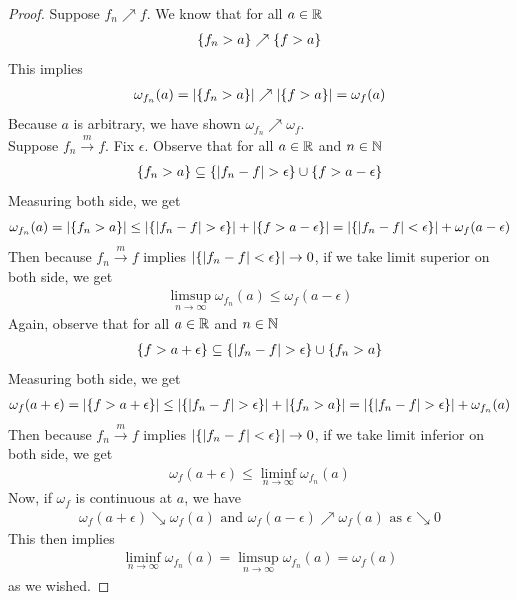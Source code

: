 \documentclass{report}
\begin{document}
\begin{proof}
Suppose $f_n\nearrow f$. We know that for all $a\in\mathbb{R}$ 
\begin{align*}
\{ f_n>a \}\nearrow \{ f>a \}
\end{align*}
This implies 
\begin{align*}
\omega_{f_n}(a)=\left|\{ f_n>a \}\right|\nearrow \left|\{ f>a \}\right|=\omega_f(a)
\end{align*}
Because $a$ is arbitrary, we have shown $\omega_{f_n}\nearrow \omega_f$. \\

Suppose $f_n\overset{m}{\to}f$. Fix $\epsilon $. Observe that for all $a\in\mathbb{R}$ and $n\in\mathbb{N}$
\begin{align*}
  \set{f_n >a}\subseteq \set{\abso{f_n-f}>\epsilon } \cup \set{f>a-\epsilon }
\end{align*}
Measuring both side, we get 
\begin{align*}
\omega_{f_n}(a)= \abso{\set{f_n>a}}\leq \abso{\set{\abso{f_n-f}>\epsilon }}+ \abso{\set{f>a-\epsilon }}= \abso{\set{\abso{f_n-f}<\epsilon }}+ \omega_f(a-\epsilon )
\end{align*}
Then because $f_n\overset{m}{\to}f$ implies $\left|\{ \left|f_n-f\right|<\epsilon  \}\right|\to 0$, if we take limit superior on both side, we get 
 \begin{align*}
\limsup_{n\to\infty} \omega_{f_n}(a)\leq \omega_f(a-\epsilon )
\end{align*}
Again, observe that for all $a\in\mathbb{R}$ and $n\in\mathbb{N}$ 
\begin{align*}
\set{f>a+\epsilon }\subseteq \set{\abso{f_n-f}>\epsilon }\cup  \set{f_n>a}
\end{align*}
Measuring both side, we get 
\begin{align*}
\omega_f(a+\epsilon )= \abso{\set{f>a+\epsilon }} \leq \abso{\set{\abso{f_n-f}>\epsilon }} + \abso{\set{f_n>a}}=\abso{\set{\abso{f_n-f}>\epsilon }} + \omega_{f_n}(a)
\end{align*}
Then because $f_n\overset{m}{\to}f$ implies $\left|\{ \left|f_n-f\right|<\epsilon  \}\right|\to 0$, if we take limit inferior on both side, we get 
\begin{align*}
 \omega_f(a+\epsilon )\leq \liminf_{n\to\infty} \omega_{f_n}(a)
\end{align*}
Now, if $\omega_f$ is continuous at $a$, we have 
 \begin{align*}
\omega_f(a+\epsilon )\searrow \omega_f(a)\text{ and }\omega_f(a-\epsilon )\nearrow \omega_f(a)\text{ as }\epsilon \searrow 0 
\end{align*}
This then implies 
\begin{align*}
\liminf_{n\to\infty} \omega_{f_n}(a)=\limsup_{n\to\infty} \omega_{f_n}(a)=\omega_f(a)
\end{align*}
as we wished.
\end{proof}
\end{document}
